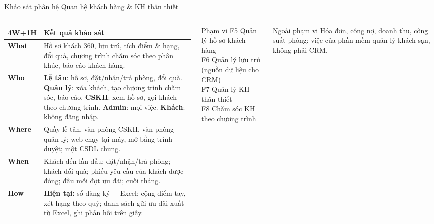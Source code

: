 
\begin{frame}{Khảo sát phân hệ Quan hệ khách hàng \& KH thân thiết \TB}
\begin{columns}[T]
\scriptsize
\begin{tabularx}{\linewidth}{@{}L{1.25cm}Y@{}}
\toprule
\textbf{4W+1H} & \textbf{Kết quả khảo sát} \\
\midrule
\textbf{What} & Hồ sơ khách 360, lưu trú, tích điểm \& hạng, đổi quà, chương trình chăm sóc theo phân khúc, báo cáo khách hàng. \\
\textbf{Who} & \textbf{Lễ tân}: hồ sơ, đặt/nhận/trả phòng, đổi quà. \textbf{Quản lý}: xóa khách, tạo chương trình chăm sóc, báo cáo. \textbf{CSKH}: xem hồ sơ, gọi khách theo chương trình. \textbf{Admin}: mọi việc. \textbf{Khách}: không đăng nhập. \\
\textbf{Where} & Quầy lễ tân, văn phòng CSKH, văn phòng quản lý; web chạy tại máy, mở bằng trình duyệt; một CSDL chung. \\
\textbf{When} & Khách đến lần đầu; đặt/nhận/trả phòng; khách đổi quà; phiếu yêu cầu của khách được đóng; đầu mỗi đợt ưu đãi; cuối tháng. \\
\textbf{How} & \textbf{Hiện tại:} sổ đăng ký + Excel; cộng điểm tay, xét hạng theo quý; danh sách gửi ưu đãi xuất từ Excel, ghi phản hồi trên giấy. \\
\bottomrule
\end{tabularx}
\begin{block}{Phạm vi}
\scriptsize
F5 Quản lý hồ sơ khách hàng\\
F6 Quản lý lưu trú (nguồn dữ liệu cho CRM)\\
F7 Quản lý KH thân thiết\\
F8 Chăm sóc KH theo chương trình
\end{block}
\begin{alertblock}{Ngoài phạm vi}
\scriptsize
Hóa đơn, công nợ, doanh thu, công suất phòng: việc của phần mềm quản lý khách sạn, không phải CRM.
\end{alertblock}
\end{columns}
\end{frame}

